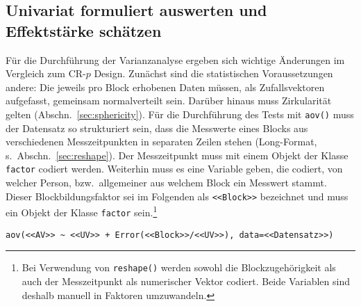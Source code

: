 \subsection{Univariat formuliert auswerten und Effektstärke schätzen}

Für die Durchführung der Varianzanalyse ergeben sich wichtige Änderungen im Vergleich zum CR-$p$ Design. Zunächst sind die statistischen Voraussetzungen andere: Die jeweils pro Block erhobenen Daten müssen, als Zufallsvektoren aufgefasst, gemeinsam normalverteilt sein. Darüber hinaus muss Zirkularität gelten (Abschn.\ \ref{sec:sphericity}). Für die Durchführung des Tests mit \lstinline!aov()! muss der Datensatz so strukturiert sein, dass die Messwerte eines Blocks aus verschiedenen Messzeitpunkten in separaten Zeilen stehen (Long-Format, s.\ Abschn.\ \ref{sec:reshape}). Der Messzeitpunkt muss mit einem Objekt der Klasse \lstinline!factor! codiert werden. Weiterhin muss es eine Variable geben, die codiert, von welcher Person, bzw.\ allgemeiner aus welchem Block ein Messwert stammt. Dieser Blockbildungsfaktor sei im Folgenden als \lstinline!<<Block>>! bezeichnet und muss ein Objekt der Klasse \lstinline!factor! sein.\footnote{Bei Verwendung von \lstinline!reshape()! werden sowohl die Blockzugehörigkeit als auch der Messzeitpunkt als numerischer Vektor codiert. Beide Variablen sind deshalb manuell in Faktoren umzuwandeln.}
\begin{lstlisting}
aov(<<AV>> ~ <<UV>> + Error(<<Block>>/<<UV>>), data=<<Datensatz>>)
\end{lstlisting}

